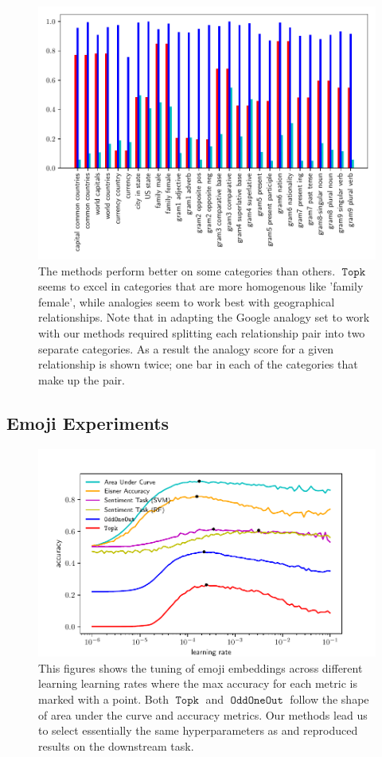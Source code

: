 \documentclass[11pt,a4paper]{article}
\DeclareMathOperator{\OddOneOut}{\texttt{OddOneOut}}
\DeclareMathOperator{\topk}{\texttt{Topk}}
\begin{document}
\begin{figure}
\centering
\includegraphics{cross_cat_acc.pdf} 
\caption{The methods perform better on some categories than others. $\topk$  seems to excel in categories that are more homogenous like 'family female',
 while analogies seem to work best with geographical relationships.
  Note that in adapting the Google analogy set to work with our methods required splitting each relationship pair into two separate categories. 
  As a result the analogy score for a given relationship is shown twice;
   one bar in each of the categories that make up the pair.}
\label{fig:data_vs_methods}
\end{figure}


\subsection{Emoji Experiments}
\begin{figure}
\centering
\includegraphics{emoji_exp.pdf} 
\caption{This figures shows the tuning of emoji embeddings across different learning learning rates where the max accuracy for each metric is marked with a point.
 Both $\topk$ and $\OddOneOut$ follow the shape of \cite{eisner2016emoji2vec} area under the curve and accuracy metrics.
 Our methods lead us to select essentially the same hyperparameters as \cite{eisner2016emoji2vec} and reproduced results on the downstream task.}
\label{fig:emoji}
\end{figure}
\end{document}

